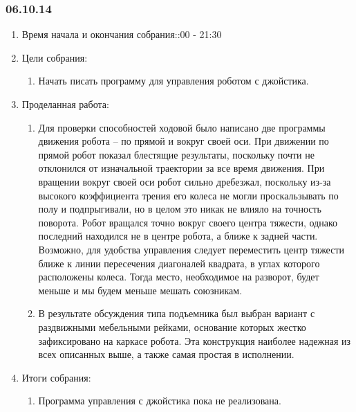 
\subsubsection{06.10.14}

\begin{enumerate}
	\item Время начала и окончания собрания::00 - 21:30
	\item Цели собрания:\newline
	\begin{enumerate}
	  \item Начать писать программу для управления роботом с джойстика.\newline
	  
    \end{enumerate}
	\item Проделанная работа:\newline
	\begin{enumerate}
	  \item Для проверки способностей ходовой было написано две программы движения робота – по прямой и вокруг своей оси. При движении по прямой робот показал блестящие результаты, поскольку почти не отклонился от изначальной траектории за все время движения. При вращении вокруг своей оси робот сильно дребезжал, поскольку из-за высокого коэффициента трения его колеса не могли проскальзывать по полу и подпрыгивали, но в целом это никак не влияло на точность поворота. Робот вращался точно вокруг своего центра тяжести, однако последний находился не в центре робота, а ближе к задней части. Возможно, для удобства управления следует переместить центр тяжести ближе к линии пересечения диагоналей квадрата, в углах которого расположены колеса. Тогда место, необходимое на разворот, будет меньше и мы будем меньше мешать союзникам.\newline
      
      \item  В результате обсуждения типа подъемника был выбран вариант с раздвижными мебельными рейками, основание которых жестко зафиксировано на каркасе робота. Эта конструкция наиболее надежная из всех описанных выше, а также самая простая в исполнении.\newline
      
    \end{enumerate}
    
	\item Итоги собрания: \newline
	\begin{enumerate}
	  \item  Программа управления с джойстика пока не реализована.\newline
	  

\end{enumerate}
\end{enumerate}
